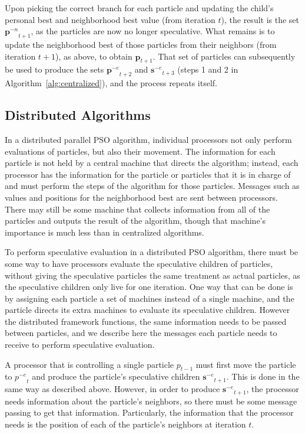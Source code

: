 \documentclass[journal,letterpaper]{IEEEtran}
\newcommand{\alg}[1]{Algorithm~\ref{alg:#1}}
\providecommand{\noeval}[1]{\ensuremath{#1^{-e}}}
\providecommand{\nonbest}[1]{\ensuremath{#1^{-n}}}
\providecommand{\p}{\ensuremath{p}}
\providecommand{\pset}{\ensuremath{\mathbf{p}}}
\providecommand{\sset}{\ensuremath{\mathbf{s}}}
\begin{document}
Upon picking the correct branch for each particle and updating the child's
personal best and neighborhood best value (from iteration $t$), the result is
the set $\nonbest{\pset}_{t+1}$, as the particles are now no longer
speculative.  What remains is to update the neighborhood best of those
particles from their neighbors (from iteration $t+1$), as above, to obtain
$\pset_{t+1}$.  That set of particles can subsequently be used to produce the
sets $\noeval{\pset}_{t+2}$ and $\noeval{\sset}_{t+3}$ (steps 1 and 2 in
\alg{centralized}), and the process repeats itself.

\subsection{Distributed Algorithms}

\label{sec:distributed}

In a distributed parallel PSO algorithm, individual processors not only perform
evaluations of particles, but also their movement.  The information for each
particle is not held by a central machine that directs the algorithm; instead,
each processor has the information for the particle or particles that it is in
charge of and must perform the steps of the algorithm for those particles.
Messages such as values and positions for the neighborhood best are sent
between processors.  There may still be some machine that collects information
from all of the particles and outputs the result of the algorithm, though that
machine's importance is much less than in centralized algorithms.

To perform speculative evaluation in a distributed PSO algorithm, there must be
some way to have processors evaluate the speculative children of particles,
without giving the speculative particles the same treatment as actual
particles, as the speculative children only live for one iteration.  One way
that can be done is by assigning each particle a set of machines instead of a
single machine, and the particle directs its extra machines to evaluate its
speculative children.  However the distributed framework functions, the same
information needs to be passed between particles, and we describe here the
messages each particle needs to receive to perform speculative evaluation.

A processor that is controlling a single particle $\p_{t-1}$ must first move
the particle to $\noeval{\p}_t$ and produce the particle's speculative children
$\noeval{\sset}_{t+1}$.  This is done in the same way as described above.
However, in order to produce $\noeval{\sset}_{t+1}$, the processor needs
information about the particle's neighbors, so there must be some message
passing to get that information.  Particularly, the information that the
processor needs is the position of each of the particle's neighbors at
iteration $t$.
\end{document}
